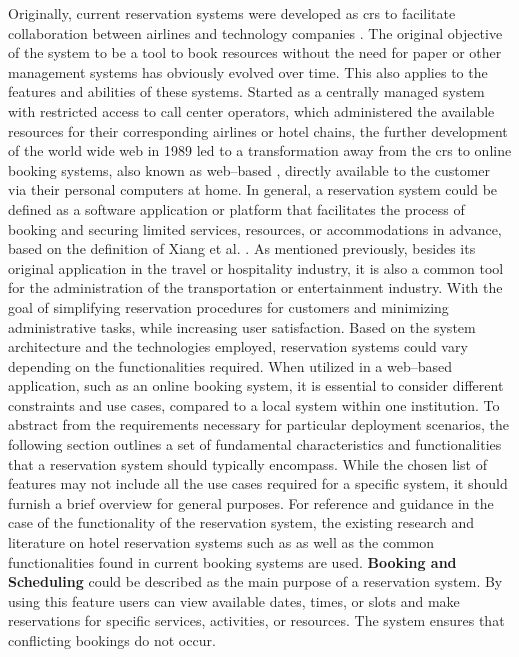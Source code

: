Originally, current reservation systems were developed as \acrfull{crs} to facilitate collaboration between airlines and technology companies \cite{xiang_evolution_2020}. The original objective of the system to be a tool to book resources without the need for paper or other management systems has obviously evolved over time.
This also applies to the features and abilities of these systems.
Started as a centrally managed system with restricted access to call center operators, which administered the available resources for their corresponding airlines or hotel chains, the further development of the world wide web in 1989 led to a transformation away from the \acrshort{crs} to online booking systems, also known as web--based , directly available to the customer via their personal computers at home.
In general, a reservation system could be defined as a software application or platform that facilitates the process of booking and securing limited services, resources, or accommodations in advance, based on the definition of Xiang et al. \cite[p.~2]{xiang_evolution_2020}. 
As mentioned previously, besides its original application in the travel or hospitality industry, it is also a common tool for the administration of the transportation or entertainment industry. With the goal of simplifying reservation procedures for customers and minimizing administrative tasks, while increasing user satisfaction.
Based on the system architecture and the technologies employed, reservation systems could vary depending on the functionalities required. When utilized in a web--based application, such as an online booking system, it is essential to consider different constraints and use cases, compared to a local system within one institution. 
To abstract from the requirements necessary for particular deployment scenarios, the following section outlines a set of fundamental characteristics and functionalities that a reservation system should typically encompass. While the chosen list of features may not include all the use cases required for a specific system, it should furnish a brief overview for general purposes.
For reference and guidance in the case of the functionality of the reservation system, the existing research and literature on hotel reservation systems such as \cite{delizo_online_2013,bemile_online_nodate} as well as the common functionalities found in current booking systems are used.
\textbf{Booking and Scheduling} could be described as the main purpose of a reservation system. By using this feature users can view available dates, times, or slots and make reservations for specific services, activities, or resources. The system ensures that conflicting bookings do not occur.
